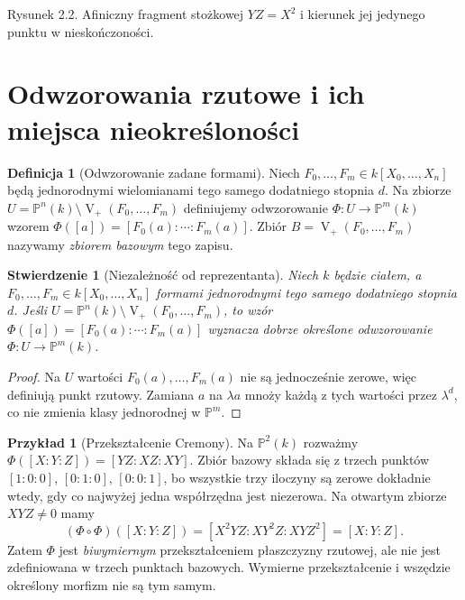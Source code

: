 \documentclass[11pt,a4paper,openany]{report}
\numberwithin{equation}{section}
\theoremstyle{plain}
\newtheorem{stwierdzenie}[twierdzenie]{Stwierdzenie}
\theoremstyle{definition}
\newtheorem{definicja}[twierdzenie]{Definicja}
\newtheorem{przyklad}[twierdzenie]{Przykład}
\theoremstyle{remark}
\newcommand{\PP}{\mathbb P}
\newcommand{\V}{\operatorname V}
\begin{document}
\begin{center}

\small Rysunek 2.2. Afiniczny fragment stożkowej $YZ=X^2$ i kierunek
jej jedynego punktu w nieskończoności.
\end{center}

\section{Odwzorowania rzutowe i ich miejsca nieokreśloności}

\begin{definicja}[Odwzorowanie zadane formami]
Niech $F_0,\dots,F_m\in k[X_0,\dots,X_n]$ będą
jednorodnymi wielomianami tego samego dodatniego stopnia $d$.
Na zbiorze $U=\PP^n(k)\setminus\V_+(F_0,\dots,F_m)$
definiujemy odwzorowanie
$\Phi:U\to\PP^m(k)$ wzorem
$\Phi([a])=[F_0(a):\cdots:F_m(a)]$.
Zbiór $B=\V_+(F_0,\dots,F_m)$ nazywamy
\emph{zbiorem bazowym} tego zapisu.
\end{definicja}

\begin{stwierdzenie}[Niezależność od reprezentanta]
Niech $k$ będzie ciałem, a $F_0,\ldots,F_m\in k[X_0,\ldots,X_n]$
formami jednorodnymi tego samego dodatniego stopnia $d$.
Jeśli $U=\PP^n(k)\setminus\V_+(F_0,\ldots,F_m)$, to wzór
$\Phi([a])=[F_0(a):\cdots:F_m(a)]$ wyznacza dobrze określone
odwzorowanie $\Phi:U\to\PP^m(k)$.
\end{stwierdzenie}
\begin{proof}
Na $U$ wartości $F_0(a),\dots,F_m(a)$ nie są jednocześnie
zerowe, więc definiują punkt rzutowy. Zamiana $a$ na
$\lambda a$ mnoży każdą z tych wartości przez $\lambda^d$,
co nie zmienia klasy jednorodnej w $\PP^m$.
\end{proof}

\begin{przyklad}[Przekształcenie Cremony]
Na $\PP^2(k)$ rozważmy
$\Phi([X:Y:Z])=[YZ:XZ:XY]$.
Zbiór bazowy składa się z trzech punktów
$[1:0:0]$, $[0:1:0]$, $[0:0:1]$, bo wszystkie trzy iloczyny
są zerowe dokładnie wtedy, gdy co najwyżej jedna współrzędna
jest niezerowa. Na otwartym zbiorze $XYZ\ne0$ mamy
\[
 (\Phi\circ\Phi)([X:Y:Z])
 =[X^2YZ:XY^2Z:XYZ^2]=[X:Y:Z].
\]
Zatem $\Phi$ jest \emph{biwymiernym} przekształceniem
płaszczyzny rzutowej, ale nie jest zdefiniowana w trzech
punktach bazowych. Wymierne przekształcenie i wszędzie
określony morfizm nie są tym samym.
\end{przyklad}
\end{document}
